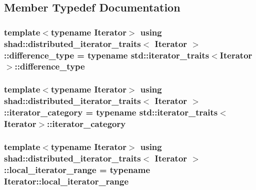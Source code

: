 \subsection{Member Typedef Documentation}
\hypertarget{structshad_1_1distributed__iterator__traits_ad4f676acbe7b835cfda9f2ba84de0617}{
\subsubsection[{difference\-\_\-type}]{\setlength{\rightskip}{0pt plus 5cm}template$<$typename Iterator$>$ using {\bf shad\-::distributed\-\_\-iterator\-\_\-traits}$<$ Iterator $>$\-::{\bf difference\-\_\-type} =  typename std\-::iterator\-\_\-traits$<$Iterator$>$\-::{\bf difference\-\_\-type}}}\label{structshad_1_1distributed__iterator__traits_ad4f676acbe7b835cfda9f2ba84de0617}
\hypertarget{structshad_1_1distributed__iterator__traits_ae2c93d2849540657dd1f56c643d75c26}{
\subsubsection[{iterator\-\_\-category}]{\setlength{\rightskip}{0pt plus 5cm}template$<$typename Iterator$>$ using {\bf shad\-::distributed\-\_\-iterator\-\_\-traits}$<$ Iterator $>$\-::{\bf iterator\-\_\-category} =  typename std\-::iterator\-\_\-traits$<$Iterator$>$\-::{\bf iterator\-\_\-category}}}\label{structshad_1_1distributed__iterator__traits_ae2c93d2849540657dd1f56c643d75c26}
\hypertarget{structshad_1_1distributed__iterator__traits_a7d2783595fdcaa86693980e101ce3c45}{
\subsubsection[{local\-\_\-iterator\-\_\-range}]{\setlength{\rightskip}{0pt plus 5cm}template$<$typename Iterator$>$ using {\bf shad\-::distributed\-\_\-iterator\-\_\-traits}$<$ Iterator $>$\-::{\bf local\-\_\-iterator\-\_\-range} =  typename Iterator\-::local\-\_\-iterator\-\_\-range}}\label{structshad_1_1distributed__iterator__traits_a7d2783595fdcaa86693980e101ce3c45}
